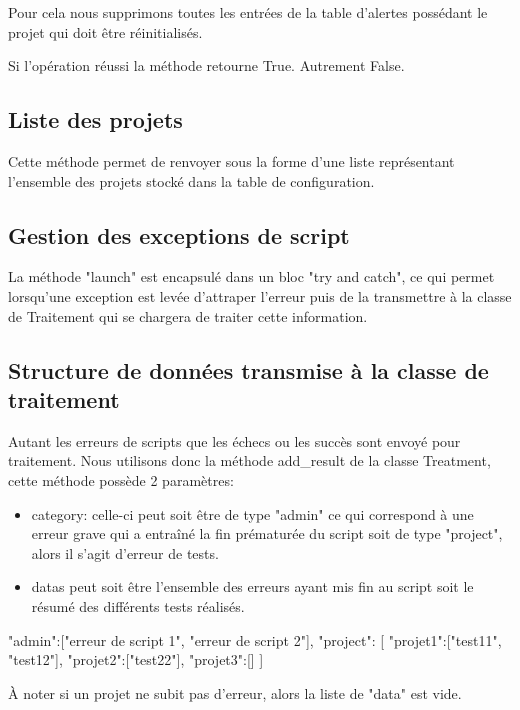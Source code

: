 Pour cela nous supprimons toutes les entrées de la table d'alertes possédant le projet qui doit être réinitialisés. 

Si l'opération réussi la méthode retourne True. Autrement False.

\subsection*{Liste des projets}

Cette méthode permet de renvoyer sous la forme d'une liste représentant l'ensemble des projets stocké dans la table de configuration.

\subsection*{Gestion des exceptions de script}

La méthode "launch" est encapsulé dans un bloc "try and catch", ce qui permet lorsqu'une exception est levée d'attraper l'erreur puis de la transmettre à la classe de Traitement qui se chargera de traiter cette information.

\subsection*{Structure de données transmise à la classe de traitement}

Autant les erreurs de scripts que les échecs ou les succès sont envoyé pour traitement. Nous utilisons donc la méthode add\_result de la classe Treatment, cette méthode possède 2 paramètres:

\begin{itemize}
\item  category: celle-ci peut soit être de type "admin" ce qui correspond à une erreur grave qui a entraîné la fin prématurée du script soit de type "project", alors il s'agit d'erreur de tests.
\item datas peut soit être l'ensemble des erreurs ayant mis fin au script soit le résumé des différents tests réalisés.
\end{itemize}


\begin{python}
{
	"admin":["erreur de script 1", "erreur de script 2"],
	"project":
	[
		"projet1":["test11", "test12"],
		"projet2":["test22"],
		"projet3":[]
	]
}
\end{python}
\`{A} noter si un projet ne subit pas d'erreur, alors la liste de "data" est vide.

